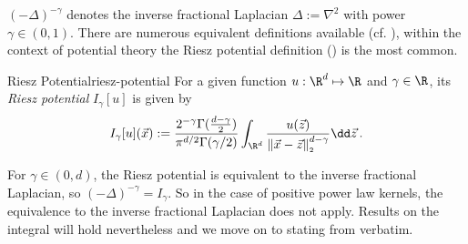 $(-\Delta)^{-\gamma}$ denotes the inverse fractional Laplacian $\Delta := \nabla^2$ with power $\gamma \in (0, 1)$.
There are numerous equivalent definitions available (cf. \cite{2015-fractional-laplacian-definitions}), within the context of potential theory the Riesz potential definition () is the most common.

\begin{definition}{Riesz Potential}{riesz-potential}
  For a given function $u: \R^d \mapsto \R$ and $\gamma \in \R$, its \textit{Riesz potential} $I_{\gamma}[u]$ is given by
  $$I_{\gamma}[u](\vec{x}) := \frac{2^{-\gamma} \Gamma(\tfrac{d-\gamma}{2})}{\pi^{d/2} \Gamma(\gamma/2)} \int_{\R^d} \frac{u(\vec{z})}{\norm{\vec{x}-\vec{z}}^{d-\gamma}} \dd\vec{z}\,.$$
\end{definition}

For $\gamma \in (0, d)$, the Riesz potential is equivalent to the inverse fractional Laplacian, so $(-\Delta)^{-\gamma} = I_\gamma$.
So in the case of positive power law kernels, the equivalence to the inverse fractional Laplacian does not apply.
Results on the integral will hold nevertheless and we move on to stating  from \cite{2021-arbitrary-dimensions} verbatim.

